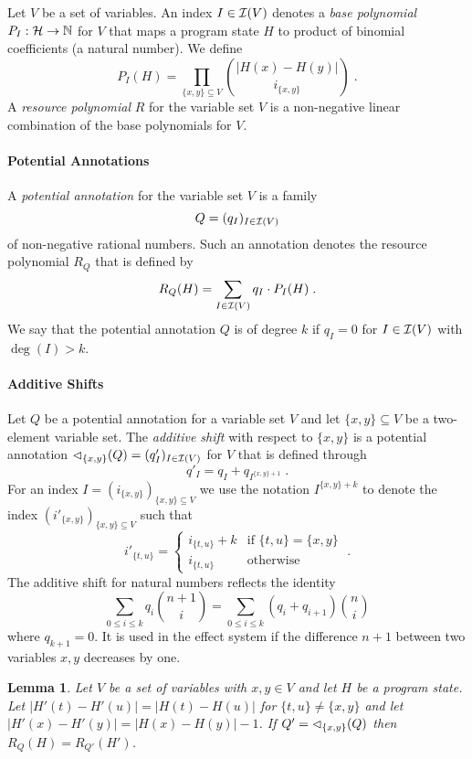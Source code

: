 \documentclass[10pt]{article}
\newtheorem{lemma}{Lemma}
\begin{document}
Let $V$ be a set of variables.  An index $I \in \mathcal{I}(V)$ denotes a
\emph{base polynomial} $P_I : \mathcal{H} \to \mathbb{N}$ for $V$ that maps a
program state $H$ to product of binomial coefficients (a natural
number).  We define
$$
P_I(H) = \prod_{{\{x,y\}} \subseteq V} \binom {|H(x){-}H(y)|} {i_{\{x,y\}}} \; .
$$
%
A \emph{resource polynomial} $R$ for the variable set $V$ is a
non-negative linear combination of the base polynomials for $V$.

\paragraph{Potential Annotations}

A \emph{potential annotation} for the variable set $V$ is a family
$$Q = (q_I)_{I \in \mathcal{I}(V)}$$ 
of non-negative rational numbers.  Such an annotation denotes the
resource polynomial $R_Q$ that is defined by
$$
R_Q(H) = \sum_{I \in \mathcal{I}(V)} q_I \cdot P_I(H) \; .
$$
%
We say that the potential annotation $Q$ is of degree $k$ if $q_I = 0$
for $I \in \mathcal{I}(V)$ with $\deg(I) > k$.

\paragraph{Additive Shifts}

Let $Q$ be a potential annotation for a variable set $V$ and let
$\{x,y\} \subseteq V$ be a two-element variable set.  The
\emph{additive shift} with respect to $\{x,y\}$ is a potential
annotation ${\lhd}_{\{x,y\}}(Q) = (q'_I)_{I \in \mathcal{I}(V)} $ for $V$
that is defined through
$$
q'_I = q_I + q_{I^{\{x,y\}{+}1}} \; .
$$
For an index $I = (i_{\{x,y\}})_{\{x,y\} \subseteq V}$ we use the
notation $I^{\{x,y\}{+}k}$ to denote the index
$(i'_{\{x,y\}})_{\{x,y\} \subseteq V}$ such that
$$
i'_{\{t,u\}} = \left\{
  \begin{array}{ll}
    i_{\{t,u\}} + k  & \text{if } \{t,u\} = \{x,y\} \\
    i_{\{t,u\}} & \text{otherwise}
  \end{array}
\right.
\;.
$$
%
The additive shift for natural numbers reflects the identity 
\begin{equation}
\label{eq:shift}
\sum_{0 {\leq} i \leq {k}} q_i \binom{n+1}{i} = \sum_{0 {\leq} i \leq {k}} (q_i{+}q_{i+1}) \binom{n}{i}
\end{equation}
where $q_{k+1} = 0$.  It is used in the effect system if the
difference $n+1$ between two variables $x,y$ decreases by one.

\begin{lemma} Let $V$ be a set of variables with $x,y \in V$ and let
  $H$ be a program state. Let $|H'(t) {-} H'(u)| = |H(t) {-} H(u)|$
  for $\{t,u\} \neq \{x,y\}$ and let $|H'(x) {-} H'(y)| = |H(x) {-}
  H(y)| - 1$.
  If $Q' = {\lhd}_{\{x,y\}}(Q)$ then $R_Q(H) = R_{Q'}(H')$.
\end{lemma}
\end{document}
